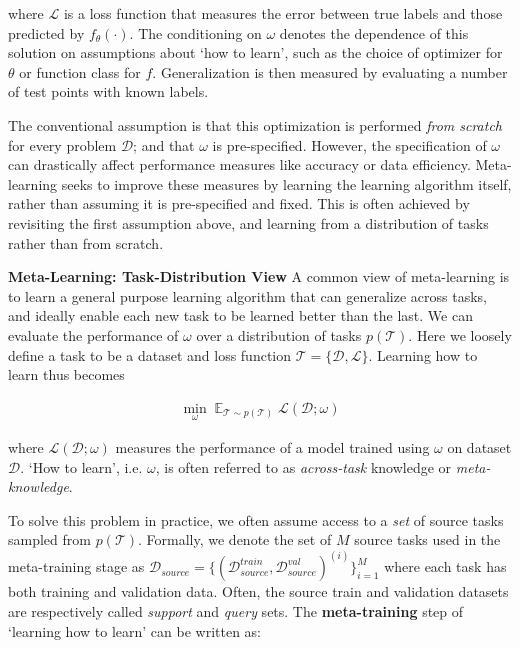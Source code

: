 \documentclass[10pt,journal,compsoc]{IEEEtran}
\newcommand{\keypoint}[1]{\vspace{0.1cm}\noindent\textbf{#1}\quad}
\DeclareMathOperator*{\E}{\mathbb{E}}
\begin{document}
\noindent where $\mathcal{L}$ is a loss function that measures the error between true labels and those predicted by $f_\theta(\cdot)$.
The conditioning on $\omega$ denotes the dependence of this solution on assumptions about `how to learn', such as the choice of optimizer for $\theta$ or function class for $f$. Generalization is then measured by evaluating a number of test points with known labels.

The conventional assumption is that this optimization is performed \emph{from scratch} for every problem $\mathcal{D}$; and that $\omega$ is pre-specified. However, the specification of $\omega$ can drastically affect performance measures like accuracy or data efficiency. Meta-learning seeks to improve these measures by learning the learning algorithm itself, rather than assuming it is pre-specified and fixed. This is often achieved by revisiting the first assumption above, and learning from a distribution of tasks rather than from scratch.

\keypoint{Meta-Learning: Task-Distribution View} A common view of meta-learning is to learn a general purpose learning algorithm that can generalize across tasks, and ideally enable each new task to be learned better than the last. We can evaluate the performance of $\omega$ over a distribution of tasks $p(\mathcal{T})$. Here we loosely define a task to be a dataset and loss function $\mathcal{T} = \{\mathcal{D}, \mathcal{L} \}$. Learning how to learn thus becomes

\begin{align}
\label{eq:metaAbstract}
 \min_\omega \E_{\mathcal{T}\sim p(\mathcal{T})} \mathcal{L(\mathcal{D};\omega)}
\end{align}

\noindent where $\mathcal{L}(\mathcal{D};\omega)$ measures the performance of a model trained using $\omega$ on dataset $\mathcal{D}$. `How to learn', i.e. $\omega$, is often referred to as \emph{across-task} knowledge or \emph{meta-knowledge}.



To solve this problem in practice, we often assume access to a \emph{set} of source tasks sampled from $p(\mathcal{T})$. Formally, we denote the set of $M$ source tasks used in the meta-training stage as $\mathscr{D}_{source}=\{(\mathcal{D}^{train}_{source}, \mathcal{D}^{val}_{source})^{(i)}\}_{i=1}^M$ where each task has both training and validation data. Often, the source train and validation datasets are respectively called \emph{support} and \emph{query} sets. The \textbf{meta-training} step of `learning how to learn' can be written as:
\end{document}
